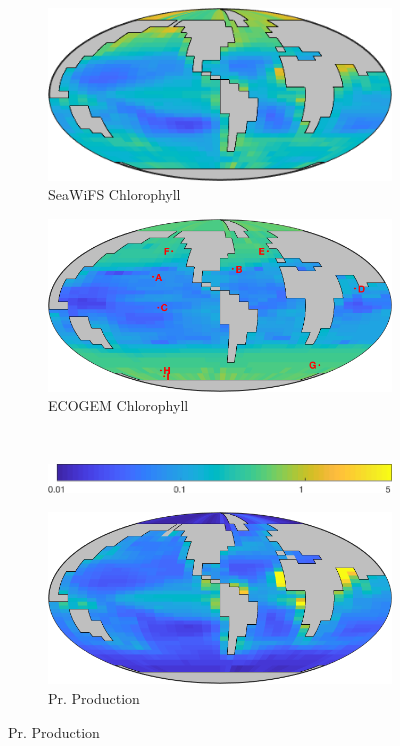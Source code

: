 \documentclass{article}
\begin{document}
\begin{figure}[htbp]
\begin{subfigure}{.5\textwidth}
\centering
 \caption{SeaWiFS Chlorophyll}
\includegraphics[width=0.95\linewidth]{Final_figures/OBSERVATIONS/SeaWiFS_on_GEnIE.png}
\end{subfigure}%
\begin{subfigure}{.5\textwidth}
\centering
 \caption{ECOGEM Chlorophyll}
\includegraphics[width=0.95\linewidth]{Final_figures/ECOGEM/Surface_Chl_Biomass.png}
\end{subfigure}%
\\[+0.2cm]
\begin{subfigure}{.5\textwidth}
 \centering
 \includegraphics[width=0.95\linewidth]{Final_figures/ECOGEM/Surface_Chl_Biomass_clrbar.png}
\end{subfigure}
\begin{subfigure}{.5\textwidth}
\centering
 \caption{\citet{Yool:2013a} Pr. Production}
\includegraphics[width=0.95\linewidth]{Final_figures/OBSERVATIONS/Composite_PP_on_GEnIE.png}

\end{subfigure}
\end{figure}
\end{document}
